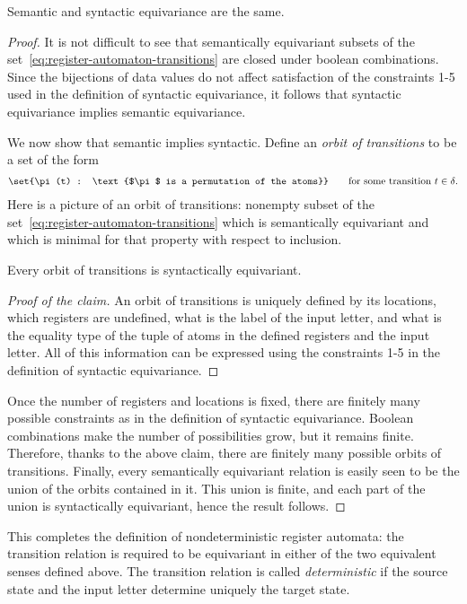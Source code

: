 \begin{lemma}\label{lem:two-types-of-equivariance}
Semantic and syntactic equivariance are the same.
\end{lemma}
\begin{proof}
	It is not difficult to see that semantically equivariant subsets of the set~\eqref{eq:register-automaton-transitions} are closed under boolean combinations. Since the bijections of data values do not affect satisfaction of the constraints 1-5 used in the definition of syntactic equivariance, it follows that syntactic equivariance implies semantic equivariance.
	
	We now show that semantic implies syntactic. Define an \emph{orbit of transitions} to be a set of the form 
	\begin{align*}
		\set{\pi(t) : \text{$\pi$ is a permutation of the atoms}} \qquad \text{for some transition $t \in \delta$}.
	\end{align*}
	Here is a picture of an orbit of transitions:
	 nonempty subset of the set~\eqref{eq:register-automaton-transitions} which is semantically equivariant and which is minimal for that property with respect to inclusion. 
	\begin{claim}
		Every orbit of transitions is syntactically equivariant.
	\end{claim}
	\begin{proof}[Proof of the claim]		
	An orbit of transitions is uniquely defined by its locations, which registers are undefined, what is the label of the input letter, and what is the equality type of the tuple of atoms in the defined registers and the input letter. All of this information can be expressed using the constraints 1-5 in the definition of syntactic equivariance.
	\end{proof}
	
	Once the number of registers and locations is fixed, there are finitely many possible constraints as in the definition of syntactic equivariance. Boolean combinations make the number of possibilities grow, but it remains finite. Therefore, thanks to the above claim, there are finitely many possible orbits of transitions. Finally, every semantically equivariant relation is easily seen to be the union of the orbits contained in it. This union is finite, and each part of the union is syntactically equivariant, hence the result follows.
\end{proof}


This completes the definition of nondeterministic register automata: the transition relation is required to be equivariant in either of the two equivalent senses defined above. The transition relation is called \emph{deterministic} if the source state and the input letter determine uniquely the target state.


